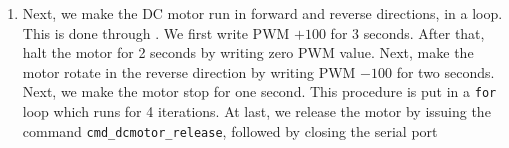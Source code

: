 \begin{enumerate}
  \item Next, we make the DC motor run in forward and reverse
        directions, in a loop.  This is done through
        .  We first write PWM $+100$ for 3
        seconds.  After that, halt the motor for 2 seconds by writing zero PWM value.
        Next, make the motor rotate in the reverse direction by writing PWM $-100$ for two seconds.
        Next, we make the motor stop for one second. This procedure is put in a {\tt for} loop which runs for 4 iterations.
        At last, we release the motor by issuing the command {\tt cmd\_dcmotor\_release}, followed by closing the serial port

\end{enumerate}










